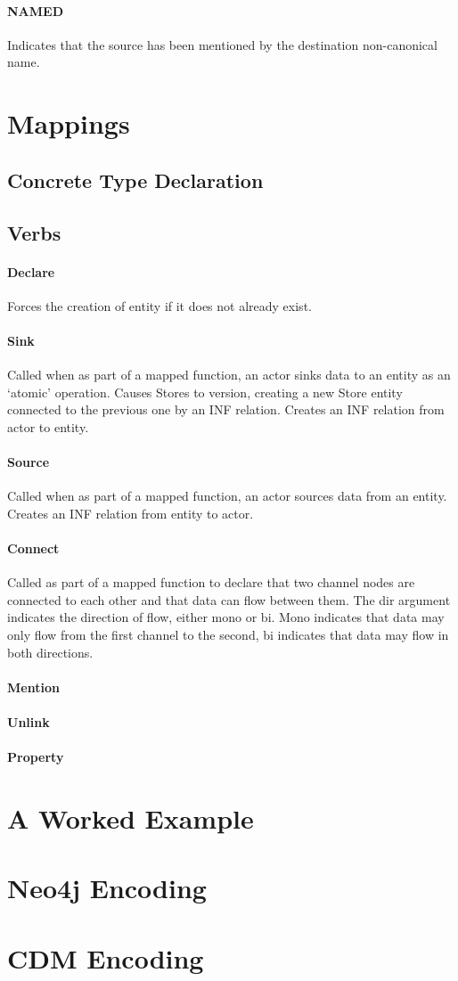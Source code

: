 \documentclass[12pt,twoside,a4paper]{article}
\newcommand{\para}[1]{\paragraph{#1\\}}
\begin{document}
\para{NAMED}
\label{sec:gs:rel:named}
Indicates that the source has been mentioned by the destination non-canonical name.

\section{Mappings}
\label{sec:map}

\subsection{Concrete Type Declaration}
\label{sec:map:tydef}

\subsection{Verbs}
\label{sec:map:verbs}

\para{Declare}
\label{sec:map:verbs:declare}
Forces the creation of entity if it does not already exist.

\para{Sink}
\label{sec:map:verbs:sink}
Called when as part of a mapped function, an actor sinks data to an entity as an ‘atomic’ operation.
Causes Stores to version, creating a new Store entity connected to the previous one by an INF relation.
Creates an INF relation from actor to entity. 

\para{Source}
\label{sec:map:verbs:source}
Called when as part of a mapped function, an actor sources data from an entity.
Creates an INF relation from entity to actor.

\para{Connect}
\label{sec:map:verbs:connect}
Called as part of a mapped function to declare that two channel nodes are connected to each other and that data can flow between them. The dir argument indicates the direction of flow, either mono or bi. Mono indicates that data may only flow from the first channel to the second, bi indicates that data may flow in both directions. 

\para{Mention}
\label{sec:map:verbs:mention}

\para{Unlink}
\label{sec:map:verbs:unlink}

\para{Property}
\label{sec:map:verbs:property}

\appendix

\section{A Worked Example}
\label{app:example}

\section{Neo4j Encoding}
\label{app:enc:neo4j}

\section{CDM Encoding}
\label{app:enc:cdm}
\end{document}
